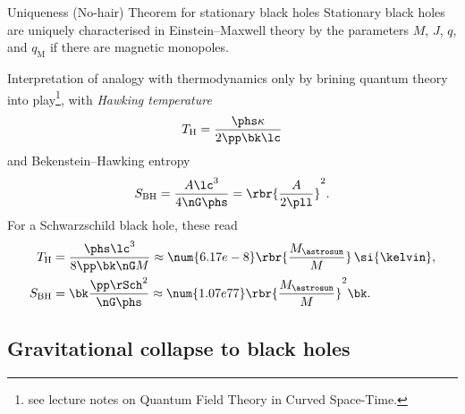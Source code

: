\begin{namedthm}{Uniqueness (No-hair) Theorem for stationary black holes}
Stationary black holes are uniquely characterised in Einstein--Maxwell theory
by the parameters $M$, $J$, $q$, and $q_\text{M}$ if there are magnetic
monopoles.
\cite{Heusler1996,lrr-2012-7}
\end{namedthm} %

\begin{unamedrem}
Interpretation of analogy with thermodynamics only by brining quantum theory
into play\footnote{see lecture notes on Quantum Field Theory in Curved
Space-Time.}, with \emph{Hawking temperature} \cite{HAWKING1974}
\begin{equation}
T_\text{H} = \frac{\phs\kappa}{2\pp\bk\lc}
\end{equation}
and Bekenstein--Hawking entropy \cite{PhysRevD.7.2333}
\begin{equation}
S_\text{BH} = \frac{A\lc^3}{4\nG\phs} = \rbr{\frac{A}{2\pll}}^2.
\end{equation}
For a Schwarzschild black hole, these read
\begin{align}
T_\text{H} &= \frac{\phs\lc^3}{8\pp\bk\nG M}\approx
\num{6.17e-8}\rbr{\frac{M_\astrosun}{M}}\,\si{\kelvin},\\
S_\text{BH} &= \bk\frac{\pp\rSch^2}{\nG\phs} \approx
\num{1.07e77}\rbr{\frac{M_\astrosun}{M}}^2\bk.
\end{align}
\end{unamedrem}

\subsection{Gravitational collapse to black holes}

